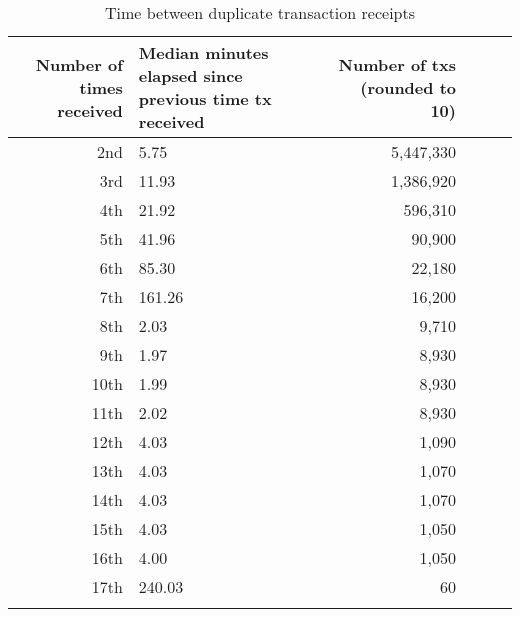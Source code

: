 \begin{longtable}{Rp{2.25cm}Rp{3cm}Rp{2.25cm}}
\caption{
{\large Time between duplicate transaction receipts}
} \\ 
\toprule
Number of times received & Median minutes elapsed since previous time tx received & Number of txs (rounded to 10) \\ 
\midrule\addlinespace[2.5pt]
2nd & 5.75 & 5,447,330 \\ 
3rd & 11.93 & 1,386,920 \\ 
4th & 21.92 & 596,310 \\ 
5th & 41.96 & 90,900 \\ 
6th & 85.30 & 22,180 \\ 
7th & 161.26 & 16,200 \\ 
8th & 2.03 & 9,710 \\ 
9th & 1.97 & 8,930 \\ 
10th & 1.99 & 8,930 \\ 
11th & 2.02 & 8,930 \\ 
12th & 4.03 & 1,090 \\ 
13th & 4.03 & 1,070 \\ 
14th & 4.03 & 1,070 \\ 
15th & 4.03 & 1,050 \\ 
16th & 4.00 & 1,050 \\ 
17th & 240.03 & 60 \\ 
\bottomrule
\label{table-multiple-send-p2p}
\end{longtable}
